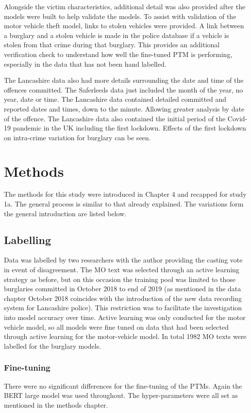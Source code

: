 Alongside the victim characteristics, additional detail was also provided after the models were built to help validate the models. To assist with validation of the motor vehicle theft model, links to stolen vehicles were provided. A link between a burglary and a stolen vehicle is made in the police database if a vehicle is stolen from that crime during that burglary. This provides an additional verification check to understand how well the fine-tuned PTM is performing, especially in the data that has not been hand labelled.

The Lancashire data also had more details surrounding the date and time of the offences committed. The Saferleeds data just included the month of the year, no year, date or time. The Lancashire data contained detailed committed and reported dates and times, down to the minute. Allowing greater analysis by date of the offence. The Lancashire data also contained the initial period of the Covid-19 pandemic in the UK including the first lockdown. Effects of the first lockdown on intra-crime variation for burglary can be seen.   


\section{Methods} The methods for this study were introduced in Chapter 4 and recapped for study 1a. The general process is similar to that already explained. The variations form the general introduction are listed below.

\subsection{Labelling} Data was labelled by two researchers with the author providing the casting vote in event of disagreement. The MO text was selected through an active learning strategy as before, but on this occasion the training pool was limited to those burglaries committed in  October 2018 to end of 2019 (as mentioned in the data chapter October 2018 coincides with the introduction of the new data recording system for Lancashire police). This restriction was to facilitate the investigation into model accuracy over time. Active learning was only conducted for the motor vehicle model, so all models were fine tuned on data that had been selected through active learning for the motor-vehicle model. In total 1982 MO texts were labelled for the burglary models.

\subsubsection{Fine-tuning} There were no significant differences for the fine-tuning of the PTMs. Again the BERT large model was used throughout. The hyper-parameters were all set as mentioned in the methods chapter. 

